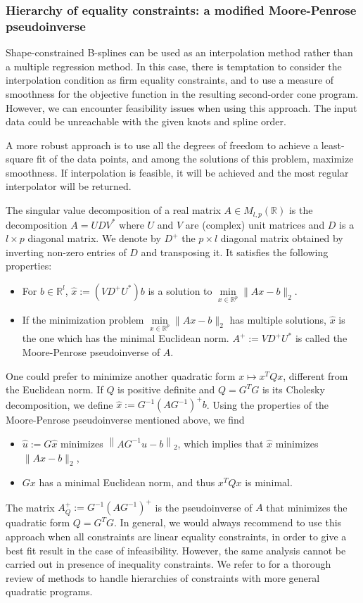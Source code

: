 \documentclass[a4paper]{article}
\newcommand{\1}{\textbf{1}}
\newcommand{\R}{\mathbb{R}}
\begin{document}
\subsubsection*{Hierarchy of equality constraints: a modified Moore-Penrose pseudoinverse}
\par Shape-constrained B-splines can be used as an interpolation method rather than a multiple regression method. In this case, there is temptation to consider the interpolation condition as firm equality constraints, and to use a measure of smoothness for the objective function in the resulting second-order cone program. However, we can encounter feasibility issues when using this approach. The input data could be unreachable with the given knots and spline order. 
\par A more robust approach is to use all the degrees of freedom to achieve a least-square fit of the data points, and among the solutions of this problem, maximize smoothness. If interpolation is feasible, it will be achieved and the most regular interpolator will be returned. 
\vspace{2mm}
\par The singular value decomposition of a real matrix $A \in M_{l,p}(\R)$ is the decomposition $A = U D V^*$ where $U$ and $V$ are (complex) unit matrices and $D$ is a $l \times p$ diagonal matrix. We denote by $D^+$ the $p \times l$ diagonal matrix obtained by inverting non-zero entries of $D$ and transposing it. It satisfies the following properties:
\begin{itemize}
\item For $b \in \R^l$, $\widehat{x}:= (V D^+ U^*) b$ is a solution to $\min\limits_{x \in \R^p} \| Ax - b\|_2$. 
\item If the minimization problem $\min\limits_{x \in \R^p} \| Ax - b\|_2$ has multiple solutions, $\widehat{x}$ is the one which has the minimal Euclidean norm. $A^+ := V D^+ U^*$ is called the Moore-Penrose pseudoinverse of $A$.
\end{itemize}
\par \noindent One could prefer to minimize another quadratic form $x \mapsto x^T Q x$, different from the Euclidean norm. If $Q$ is positive definite and $Q = G^T G$ is its Cholesky decomposition, we define $\widehat{x}:= G^{-1}\left(AG^{-1}\right)^+ b$. Using the properties of the Moore-Penrose pseudoinverse mentioned above, we find
\begin{itemize}
\item $\widehat{u} := G \widehat{x}$ minimizes $\left\|A G^{-1}u - b \right\|_2$, which implies that $\widehat{x}$ minimizes$ \|Ax - b \|_2$,
\item $Gx$ has a minimal Euclidean norm, and thus $x^T Q x$ is minimal. 
\end{itemize}
The matrix $A_Q^+:= G^{-1} \left(AG^{-1}\right)^+$ is the pseudoinverse of $A$ that minimizes the quadratic form $Q = G^T G$. In general, we would always recommend to use this approach when all constraints are linear equality constraints, in order to give a best fit result in the case of infeasibility. However, the same analysis cannot be carried out in presence of inequality constraints. We refer to \cite{hierarchQuadraticProgramming} for a thorough review of methods to handle hierarchies of constraints with more general quadratic programs.
\end{document}
